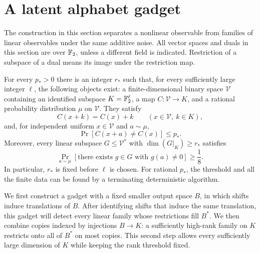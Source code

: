 \section{A latent alphabet gadget}\label{sec:latent}

The construction in this section separates a nonlinear observable from families
of linear observables under the same additive noise.  All vector spaces and
duals in this section are over $\mathbb F_2$, unless a different field is indicated.
Restriction of a subspace of a dual means its image under the restriction map.

\begin{lemma}\label{lem:latent}
For every $p_*>0$ there is an integer $r_*$ such that, for every sufficiently
large integer $\ell$, the following objects exist: a finite-dimensional binary
space $\mathcal V$ containing an identified subspace $K=\mathbb F_2^\ell$, a map
$C:\mathcal V\to K$, and a rational probability distribution $\mu$ on
$\mathcal V$.  They satisfy
\begin{equation}\label{eq:latent-equivariance}
 C(x+k)=C(x)+k
 \qquad(x\in\mathcal V,\ k\in K),
\end{equation}
and, for independent uniform $x\in\mathcal V$ and $a\sim\mu$,
\begin{equation}\label{eq:latent-small-change}
 \Pr[C(x+a)\ne C(x)]\le p_*.
\end{equation}
Moreover, every linear subspace $G\le\mathcal V^*$ with
$\dim(G|_K)\ge r_*$ satisfies
\begin{equation}\label{eq:latent-detection}
 \Pr_{a\sim\mu}[\text{there exists }g\in G\text{ with }g(a)\ne0]
 \ge\frac18.
\end{equation}
In particular, $r_*$ is fixed before $\ell$ is chosen.
For rational $p_*$, the threshold and all the finite data can be found by a
terminating deterministic algorithm.
\end{lemma}

We first construct a gadget with a fixed smaller output space $B$, in which
shifts induce translations of $B$.  After identifying shifts that induce
the same translation, this gadget will detect every linear family whose
restrictions fill $B^*$.  We then combine copies indexed by injections
$B\to K$: a sufficiently high-rank family on $K$ restricts onto all of
$B^*$ on most copies.  This second step allows every sufficiently large
dimension of $K$ while keeping the rank threshold fixed.

